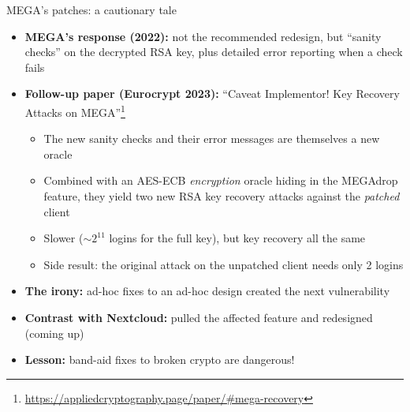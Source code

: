 \ifdefined\PRESENTATION\else\PassOptionsToClass{handout}{beamer}\fi\documentclass[aspectratio=169, lualatex]{beamer}
\begin{document}
\begin{frame}{MEGA's patches: a cautionary tale}
	\begin{itemize}
		\item \textbf{MEGA's response (2022):} not the recommended redesign, but ``sanity checks'' on the decrypted RSA key, plus detailed error reporting when a check fails
		\item \textbf{Follow-up paper (Eurocrypt 2023):} ``Caveat Implementor! Key Recovery Attacks on MEGA''\footnote{\url{https://appliedcryptography.page/paper/\#mega-recovery}}
		      \begin{itemize}
			      \item The new sanity checks and their error messages are themselves a new oracle
			      \item Combined with an AES-ECB \textit{encryption} oracle hiding in the MEGAdrop feature, they yield two new RSA key recovery attacks against the \textit{patched} client
			      \item Slower (${\sim}2^{11}$ logins for the full key), but key recovery all the same
			      \item Side result: the original attack on the unpatched client needs only 2 logins
		      \end{itemize}
		\item \textbf{The irony:} ad-hoc fixes to an ad-hoc design created the next vulnerability
		\item \textbf{Contrast with Nextcloud:} pulled the affected feature and redesigned (coming up)
		\item \textbf{Lesson:} band-aid fixes to broken crypto are dangerous!
	\end{itemize}
\end{frame}
\end{document}
